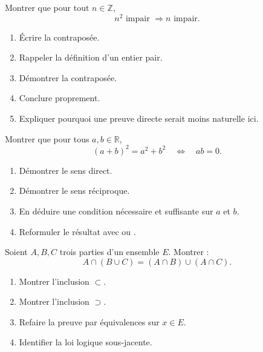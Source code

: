 \documentclass[11pt,a4paper]{article}
\newcommand{\Z}{\mathbb{Z}}
\newcommand{\R}{\mathbb{R}}
\newcommand{\imp}{\Rightarrow}
\begin{document}
\begin{exercicebox}
Montrer que pour tout \(n\in\Z\),
\[
n^2 \text{ impair } \imp n \text{ impair}.
\]

\begin{enumerate}[label=\alph*)]
    \item Écrire la contraposée.
    \item Rappeler la définition d'un entier pair.
    \item Démontrer la contraposée.
    \item Conclure proprement.
    \item Expliquer pourquoi une preuve directe serait moins naturelle ici.
\end{enumerate}
\end{exercicebox}

\begin{exercicebox}
Montrer que pour tous \(a,b\in\R\),
\[
(a+b)^2=a^2+b^2\quad \Longleftrightarrow\quad ab=0.
\]

\begin{enumerate}[label=\alph*)]
    \item Démontrer le sens direct.
    \item Démontrer le sens réciproque.
    \item En déduire une condition nécessaire et suffisante sur \(a\) et \(b\).
    \item Reformuler le résultat avec \og ou \fg{}.
\end{enumerate}
\end{exercicebox}

\begin{exercicebox}
Soient \(A,B,C\) trois parties d'un ensemble \(E\). Montrer :
\[
A\cap(B\cup C)=(A\cap B)\cup(A\cap C).
\]

\begin{enumerate}[label=\alph*)]
    \item Montrer l'inclusion \(\subset\).
    \item Montrer l'inclusion \(\supset\).
    \item Refaire la preuve par équivalences sur \(x\in E\).
    \item Identifier la loi logique sous-jacente.
\end{enumerate}
\end{exercicebox}
\end{document}
